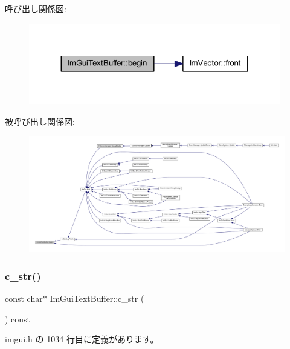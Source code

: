 呼び出し関係図\+:\nopagebreak
\begin{figure}[H]
\begin{center}
\leavevmode
\includegraphics[width=311pt]{struct_im_gui_text_buffer_aab6d83c6b9a8061287a4cb6135c1cab4_cgraph}
\end{center}
\end{figure}
被呼び出し関係図\+:
\nopagebreak
\begin{figure}[H]
\begin{center}
\leavevmode
\includegraphics[width=350pt]{struct_im_gui_text_buffer_aab6d83c6b9a8061287a4cb6135c1cab4_icgraph}
\end{center}
\end{figure}
\mbox{\label{struct_im_gui_text_buffer_afb03439bc91723e274bfb9d247a691b9}} 
\subsubsection{\texorpdfstring{c\+\_\+str()}{c\_str()}}
{\footnotesize\ttfamily const char$\ast$ Im\+Gui\+Text\+Buffer\+::c\+\_\+str (\begin{DoxyParamCaption}{ }\end{DoxyParamCaption}) const\hspace{0.3cm}{\ttfamily [inline]}}



 imgui.\+h の 1034 行目に定義があります。

